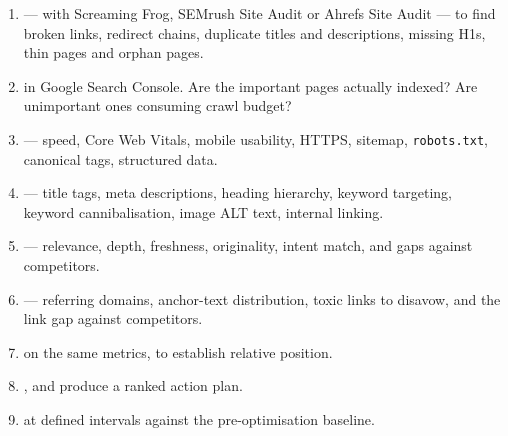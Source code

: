 \begin{enumerate}
\item {} --- with Screaming Frog, SEMrush Site Audit or Ahrefs
      Site Audit --- to find broken links, redirect chains, duplicate titles and
      descriptions, missing H1s, thin pages and orphan pages.
\item {} in Google Search Console. Are the important pages
      actually indexed? Are unimportant ones consuming crawl budget?
\item {} --- speed, Core Web Vitals, mobile usability,
      HTTPS, sitemap, \texttt{robots.txt}, canonical tags, structured data.
\item {} --- title tags, meta descriptions, heading
      hierarchy, keyword targeting, keyword cannibalisation, image ALT text,
      internal linking.
\item {} --- relevance, depth, freshness, originality, intent
      match, and gaps against competitors.
\item {} --- referring domains, anchor-text distribution,
      toxic links to disavow, and the link gap against competitors.
\item {} on the same metrics, to establish relative
      position.
\item {}, and produce a ranked
      action plan.
\item {} at defined intervals against the
      pre-optimisation baseline.
\end{enumerate}

